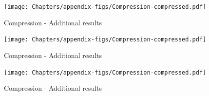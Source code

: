  \begin{figure}[ht]
   \centering
  {\texttt{[image: Chapters/appendix-figs/Compression-compressed.pdf]}}
  \caption{Compression - Additional results}
    \label{fig:appendix-compression1}
 \end{figure}
 
\newpage
 \begin{figure}[ht]
   \centering
  {\texttt{[image: Chapters/appendix-figs/Compression-compressed.pdf]}}
  \caption{Compression - Additional results}
    \label{fig:appendix-compression2}
 \end{figure}

\newpage
 \begin{figure}[ht]
   \centering
  {\texttt{[image: Chapters/appendix-figs/Compression-compressed.pdf]}}
  \caption{Compression - Additional results}
    \label{fig:appendix-compression3}
 \end{figure}


